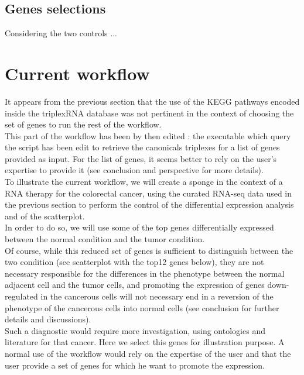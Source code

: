 \documentclass[a4paper,12pt]{report}
\begin{document}
\subsection{Genes selections}

Considering the two controls ...

\section{Current workflow}


It appears from the previous section that the use of the KEGG pathways encoded inside the triplexRNA database was not pertinent in the context of choosing the set of genes to run the rest of the workflow.\\

This part of the workflow has been by then edited : the executable which query the script has been edit to retrieve the canonicals triplexes for a list of genes provided as input. For the list of genes, it seems better to rely on the user's expertise to provide it (see conclusion and perspective for more details).\\

To illustrate the current workflow, we will create a sponge in the context of a RNA therapy for the colorectal cancer, using the curated RNA-seq data\cite{curated} used in the previous section to perform the control of the differential expression analysis and of the scatterplot.\\

In order to do so, we will use some of the top genes differentially expressed between the normal condition and the tumor condition.\\

Of course, while this reduced set of genes is sufficient to distinguish between the two condition (see scatterplot with the top12 genes below), they are not necessary responsible for the differences in the phenotype between the normal adjacent cell and the tumor cells, and promoting the expression of genes down-regulated in the cancerous cells will not necessary end in a reversion of the phenotype of the cancerous cells into normal cells (see conclusion for further details and discussions).\\

Such a diagnostic would require more investigation, using ontologies and literature for that cancer\cite{colorectal}. Here we select this genes for illustration purpose. A normal use of the workflow would rely on the expertise of the user and that the user provide a set of genes for which he want to promote the expression.\\
\end{document}
